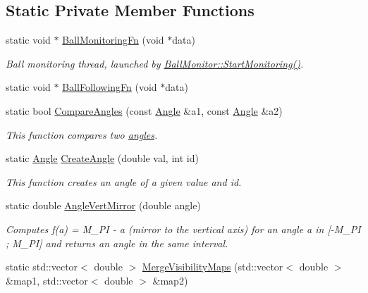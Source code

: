 \subsection*{Static Private Member Functions}
\begin{DoxyCompactItemize}
\item 
static void $\ast$ \hyperlink{classBallMonitor_af76da8bc13e92d9083a9a77469c472df}{BallMonitoringFn} (void $\ast$data)
\begin{DoxyCompactList}\small\item\em Ball monitoring thread, launched by \hyperlink{classBallMonitor_a4d2b3aa764f5d4f4d5f58b7530565f90}{BallMonitor::StartMonitoring()}. \item\end{DoxyCompactList}\item 
static void $\ast$ \hyperlink{classBallMonitor_a2ca3e25f437b5aabb3bc88e0f84cf9a5}{BallFollowingFn} (void $\ast$data)
\item 
static bool \hyperlink{classBallMonitor_a78114ec7fc20317f84491e428dd8c126}{CompareAngles} (const \hyperlink{structBallMonitor_1_1Angle}{Angle} \&a1, const \hyperlink{structBallMonitor_1_1Angle}{Angle} \&a2)
\begin{DoxyCompactList}\small\item\em This function compares two \hyperlink{structBallMonitor_1_1Angle}{angles}. \item\end{DoxyCompactList}\item 
static \hyperlink{structBallMonitor_1_1Angle}{Angle} \hyperlink{classBallMonitor_a805b7229e7db773c56e9987d794ada9a}{CreateAngle} (double val, int id)
\begin{DoxyCompactList}\small\item\em This function creates an angle of a given value and id. \item\end{DoxyCompactList}\item 
static double \hyperlink{classBallMonitor_a32d7b6d877b84c7d7fd9bc9ffe659562}{AngleVertMirror} (double angle)
\begin{DoxyCompactList}\small\item\em Computes f(a) = M\_\-PI -\/ a (mirror to the vertical axis) for an angle a in \mbox{[}-\/M\_\-PI ; M\_\-PI\mbox{]} and returns an angle in the same interval. \item\end{DoxyCompactList}\item 
static std::vector$<$ double $>$ \hyperlink{classBallMonitor_a74f8a1ce881528e475269fa1c964fa61}{MergeVisibilityMaps} (std::vector$<$ double $>$ \&map1, std::vector$<$ double $>$ \&map2)

\end{DoxyCompactItemize}
